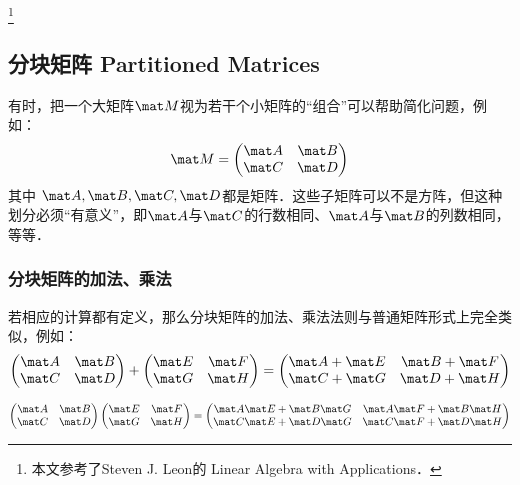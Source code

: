 
\begin{issues}
\issueDraft
\end{issues}
\footnote{本文参考了Steven J. Leon的 Linear Algebra with Applications．}

\subsection{分块矩阵 Partitioned Matrices}

有时，把一个大矩阵$\mat M$视为若干个小矩阵的“组合”可以帮助简化问题，例如：
\begin{equation}
\mat M = 
\begin{pmatrix}
\mat A & \mat B\\
\mat C & \mat D\\
\end{pmatrix}
\end{equation}
其中 $\mat A, \mat B, \mat C, \mat D$都是矩阵．这些子矩阵可以不是方阵，但这种划分必须“有意义”，即$\mat A$与$\mat C$的行数相同、$\mat A$与$\mat B$的列数相同，等等．

\subsubsection{分块矩阵的加法、乘法}
若相应的计算都有定义，那么分块矩阵的加法、乘法法则与普通矩阵形式上完全类似，例如：
\begin{equation}
\begin{pmatrix}
\mat A & \mat B\\
\mat C & \mat D\\
\end{pmatrix}
+
\begin{pmatrix}
\mat E & \mat F\\
\mat G & \mat H\\
\end{pmatrix}
=
\begin{pmatrix}
\mat A +\mat E & \mat B +\mat F\\
\mat C +\mat G & \mat D +\mat H\\
\end{pmatrix}
\end{equation}

\begin{equation}
\begin{pmatrix}
\mat A & \mat B\\
\mat C & \mat D\\
\end{pmatrix}
\begin{pmatrix}
\mat E & \mat F\\
\mat G & \mat H\\
\end{pmatrix}
=
\begin{pmatrix}
\mat A \mat E +\mat B \mat G & \mat A \mat F +\mat B \mat H \\
\mat C \mat E +\mat D \mat G  & \mat C \mat F +\mat D \mat H \\
\end{pmatrix}
\end{equation}

